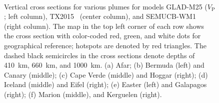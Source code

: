 \documentclass[extra,mreferee]{gji}
\begin{document}
\begin{figure}[ht]
    \centering
    \\[-1pt]
    \\[-1pt]
    \\[-1pt]
    \\[-1pt]
    \\[-1pt]
    \\
    \caption{Vertical cross sections for various plumes for models GLAD-M25 ($V_\textrm{P}$; left column), TX2015~\citep[$V_\textrm{S}$;][]{TX2015} (center column), and SEMUCB-WM1~\citep[$V_\textrm{S}$;][]{french2015broad} (right column).
    The map in the top left corner of each row shows the cross section with color-coded red, green, and white dots for geographical reference;
    hotspots are denoted by red triangles.
    The dashed black semicircles in the cross sections denote depths of 410~km, 660~km, and 1000~km.
    (a) Afar; (b) Bermuda (left) and Canary (middle); (c) Cape Verde (middle) and Hoggar (right); (d) Iceland (middle) and Eifel (right); (e) Easter (left) and Galapagos (right); (f) Marion (middle), and Kerguelen (right). }
    \label{fig:plumes}
\end{figure}
\end{document}
